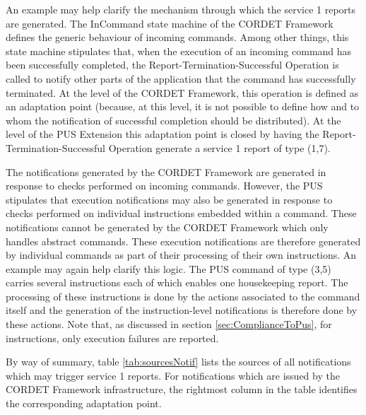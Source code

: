 \documentclass{pnp_article}
\begin{document}
An example may help clarify the mechanism through which the service 1 reports are generated. The InCommand state machine of the CORDET Framework defines the generic behaviour of incoming commands. Among other things, this state machine stipulates that, when the execution of an incoming command has been successfully completed, the Report-Termination-Successful Operation is called to notify other parts of the application that the command has successfully terminated. At the level of the CORDET Framework, this operation is defined as an adaptation point (because, at this level, it is not possible to define how and to whom the notification of successful completion should be distributed). At the level of the PUS Extension this adaptation point is closed by having the Report-Termination-Successful Operation generate a service 1 report of type (1,7).

The notifications generated by the CORDET Framework are generated in response to checks performed on incoming commands. However, the PUS stipulates that execution notifications may also be generated in response to checks performed on individual instructions embedded within a command. These notifications cannot be generated by the CORDET Framework which only handles abstract commands. These execution notifications are therefore generated by individual commands as part of their processing of their own instructions. An example may again help clarify this logic. The PUS command of type (3,5) carries several instructions each of which enables one housekeeping report. The processing of these instructions is done by the actions associated to the command itself and the generation of the instruction-level notifications is therefore done by these actions. Note that, as discussed in section \ref{sec:ComplianceToPus}, for instructions, only execution failures are reported.

By way of summary, table \ref{tab:sourcesNotif} lists the sources of all notifications which may trigger service 1 reports. For notifications which are issued by the CORDET Framework infrastructure, the rightmost column in the table identifies the corresponding adaptation point.
\end{document}
